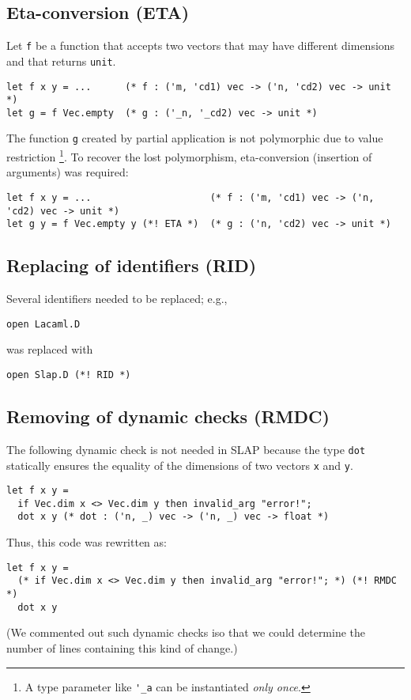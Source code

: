 \documentclass[10pt,a4paper]{article}
\begin{document}
\subsection{Eta-conversion (ETA)}
\label{sec:ETA}

Let \lstinline|f| be a function that accepts two vectors that may have different dimensions
and that returns \lstinline|unit|.
\begin{lstlisting}
let f x y = ...      (* f : ('m, 'cd1) vec -> ('n, 'cd2) vec -> unit *)
let g = f Vec.empty  (* g : ('_n, '_cd2) vec -> unit *)
\end{lstlisting}
The function \lstinline|g| created by partial application is not polymorphic due to value restriction%
\footnote{A type parameter like \lstinline|'_a| can be instantiated \emph{only once}.}.
To recover the lost polymorphism, eta-conversion (insertion of arguments) was required:
\begin{lstlisting}
let f x y = ...                     (* f : ('m, 'cd1) vec -> ('n, 'cd2) vec -> unit *)
let g y = f Vec.empty y (*! ETA *)  (* g : ('n, 'cd2) vec -> unit *)
\end{lstlisting}

\subsection{Replacing of identifiers (RID)}
\label{sec:RID}

Several identifiers needed to be replaced; e.g.,
\begin{lstlisting}
open Lacaml.D
\end{lstlisting}
was replaced with
\begin{lstlisting}
open Slap.D (*! RID *)
\end{lstlisting}

\subsection{Removing of dynamic checks (RMDC)}
\label{sec:RMDC}

The following dynamic check is not needed in SLAP because the type
\lstinline|dot| statically ensures the equality of the dimensions of two vectors
\lstinline|x| and \lstinline|y|.
\begin{lstlisting}
let f x y =
  if Vec.dim x <> Vec.dim y then invalid_arg "error!";
  dot x y (* dot : ('n, _) vec -> ('n, _) vec -> float *)
\end{lstlisting}
Thus, this code was rewritten as:
\begin{lstlisting}
let f x y =
  (* if Vec.dim x <> Vec.dim y then invalid_arg "error!"; *) (*! RMDC *)
  dot x y
\end{lstlisting}
(We commented out such dynamic checks iso that we could determine
the number of lines containing this kind of change.)
\end{document}

